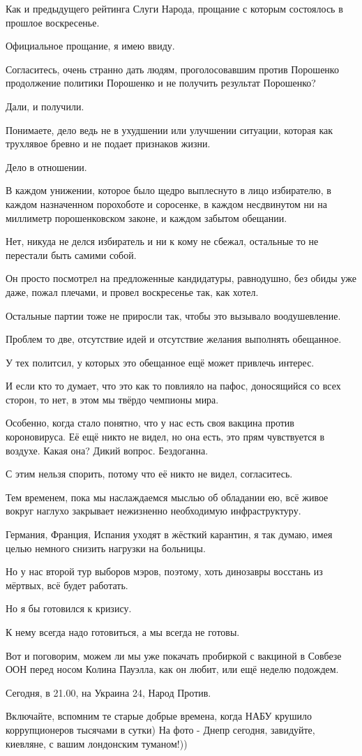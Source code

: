 Как и предыдущего рейтинга Слуги Народа, прощание с которым состоялось в
прошлое воскресенье.

Официальное прощание, я имею ввиду.

Согласитесь, очень странно дать людям, проголосовавшим против Порошенко
продолжение политики Порошенко и не получить результат Порошенко?

Дали, и получили.

Понимаете, дело ведь не в ухудшении или улучшении ситуации, которая как
трухлявое бревно и не подает признаков жизни.

Дело в отношении.

В каждом унижении, которое было щедро выплеснуто в лицо избирателю, в каждом
назначенном порохоботе и соросенке, в каждом несдвинутом ни на миллиметр
порошенковском законе,  и каждом забытом обещании.

Нет, никуда не делся избиратель и ни к кому не сбежал, остальные то не
перестали быть самими собой.

Он просто посмотрел на предложенные кандидатуры, равнодушно, без обиды уже
даже, пожал плечами, и провел воскресенье так, как хотел.

Остальные партии тоже не приросли так, чтобы это вызывало воодушевление.

Проблем то две, отсутствие идей и отсутствие желания выполнять обещанное.

У тех политсил, у которых это обещанное ещё может привлечь интерес.

И если кто то думает, что это как то повлияло на пафос, доносящийся со всех
сторон, то нет, в этом мы твёрдо чемпионы мира.

Особенно, когда стало понятно, что у нас есть своя вакцина против короновируса.
Её ещё никто не видел, но она есть, это прям чувствуется в воздухе.  Какая она?
Дикий вопрос.  Бездоганна.

С этим нельзя спорить, потому что её никто не видел, согласитесь.

Тем временем, пока мы наслаждаемся мыслью об обладании ею, всё живое вокруг
наглухо закрывает нежизненно необходимую инфраструктуру.

Германия, Франция, Испания уходят в жёсткий карантин, я так думаю, имея целью
немного снизить нагрузки на больницы.

Но у нас второй тур выборов мэров, поэтому, хоть динозавры восстань из мёртвых,
всё будет работать.

Но я бы готовился к кризису.

К нему всегда надо готовиться, а мы всегда не готовы.

Вот и поговорим, можем ли мы уже покачать пробиркой с вакциной в Совбезе ООН
перед носом Колина Пауэлла, как он любит, или ещё неделю подождем.

Сегодня, в 21.00, на Украина 24, Народ Против.

Включайте, вспомним те старые добрые времена, когда НАБУ крушило коррупционеров
тысячами в сутки) На фото - Днепр сегодня, завидуйте, киевляне, с вашим
лондонским туманом!))
